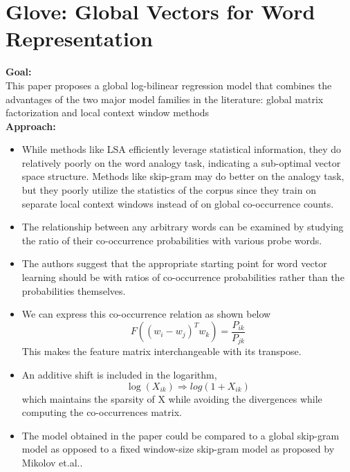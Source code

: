 \documentclass[11pt,a4paper]{article}
\begin{document}


\section{Glove: Global Vectors for Word Representation} %
\label{sec:glove_global_vectors_for_word_representation}

  \textbf{Goal:}\\
  This paper proposes a global log-bilinear regression model that combines the advantages of the two major model families in the literature: global matrix factorization and local context window methods\\

  \textbf{Approach:}
  \begin{itemize}
    \item 
    While methods like LSA efficiently leverage statistical information, they do relatively poorly on the word analogy task, indicating a sub-optimal vector space structure. Methods like skip-gram may do better on the analogy task, but they poorly utilize the statistics of the corpus since they train on separate local context windows instead of on global co-occurrence counts.
    \item 
    The relationship between any arbitrary words can be examined by studying the ratio of their co-occurrence probabilities with various probe words.
    \item 
    The authors suggest that the appropriate starting point for word vector learning should be with ratios of co-occurrence probabilities rather than the probabilities themselves.
    \item 
    We can express this co-occurrence relation as shown below
    $$F((w_i - w_j)^T w_k) = \frac{P_{ik}}{P_{jk}}$$
    This makes the feature matrix interchangeable with its transpose.
    \item 
    An additive shift is included in the logarithm, $$\log(X_{ik}) \Rightarrow log(1 + X_{ik})$$ which maintains the sparsity of X while avoiding the divergences while computing the co-occurrences matrix.
    \item 
    The model obtained in the paper could be compared to a global skip-gram model as opposed to a fixed window-size skip-gram model as proposed by Mikolov et.al.\cite{mikolov2013efficient}.
  \end{itemize}

\end{document}
